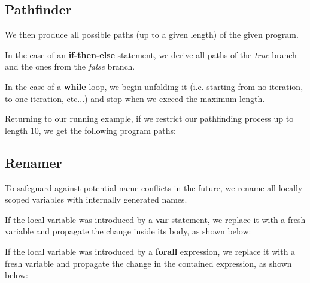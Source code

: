\documentclass[nonatbib,numbers,10pt]{sigplanconf}
\begin{document}
\subsection{Pathfinder}
We then produce all possible paths (up to a given length) of the given program.

In the case of an \textbf{if-then-else} statement, we derive all paths of the \textit{true} branch and the ones from the \textit{false} branch.

In the case of a \textbf{while} loop, we begin unfolding it (i.e. starting from no iteration, to one iteration, etc...) and stop when we exceed the maximum length.

Returning to our running example, if we restrict our pathfinding process up to length 10, we get the following program paths:

{}

\subsection{Renamer}
To safeguard against potential name conflicts in the future, we rename all locally-scoped variables with internally generated names.

If the local variable was introduced by a \textbf{var} statement, we replace it with a fresh variable and propagate the change inside its body, as shown below:


If the local variable was introduced by a \textbf{forall} expression, we replace it with a fresh variable and propagate the change in the contained expression, as shown below:
\end{document}
